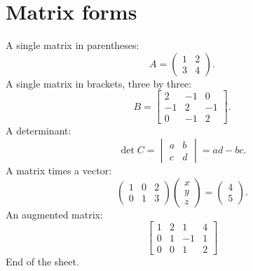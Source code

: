 \documentclass[11pt]{article}
\begin{document}
\section*{Matrix forms}
A single matrix in parentheses:
\[ A = \begin{pmatrix} 1 & 2 \\ 3 & 4 \end{pmatrix}. \]
A single matrix in brackets, three by three:
\[ B = \begin{bmatrix} 2 & -1 & 0 \\ -1 & 2 & -1 \\ 0 & -1 & 2 \end{bmatrix}. \]
A determinant:
\[ \det C = \begin{vmatrix} a & b \\ c & d \end{vmatrix} = ad - bc. \]
A matrix times a vector:
\[ \begin{pmatrix} 1 & 0 & 2 \\ 0 & 1 & 3 \end{pmatrix} \begin{pmatrix} x \\ y \\ z \end{pmatrix} = \begin{pmatrix} 4 \\ 5 \end{pmatrix}. \]
An augmented matrix:
\[ \left[\begin{array}{ccc|c} 1 & 2 & 1 & 4 \\ 0 & 1 & -1 & 1 \\ 0 & 0 & 1 & 2 \end{array}\right] \]
End of the sheet.
\end{document}
